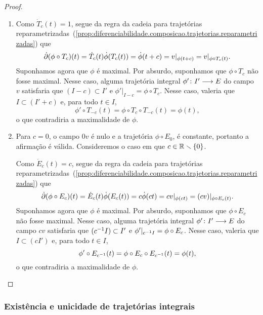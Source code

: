 \begin{proof}
	\begin{enumerate}
	\item Como $\dot T_{c}(t) = 1$, segue da regra da cadeia para trajetórias reparametrizadas~(\ref{prop:diferenciabilidade.composicao.trajetorias.reparametrizadas}) que
		\begin{equation*}
		\dot{\partial}(\phi \circ T_{c})(t) = \dot T_{c}(t) \dot \phi(T_{c}(t)) = \dot \phi(t+c) = v|_{\phi(t+c)} = v|_{\phi \circ T_{c}(t)}.
		\end{equation*}
	Suponhamos agora que $\phi$ é maximal. Por absurdo, suponhamos que $\phi \circ T_{c}$ não fosse maximal. Nesse caso, alguma trajetória integral $\phi'\colon \allowbreak I' \longrightarrow E$ do campo $v$ satisfaria que $(I-c) \subset I'$ e $\phi'|_{I-c} = \phi \circ T_{c}$. Nesse caso, valeria que $I \subset (I'+c)$ e, para todo $t \in I$,
		\begin{equation*}
		\phi' \circ T_{-c}(t) = \phi \circ T_{c} \circ T_{-c} (t) = \phi(t),
		\end{equation*}
	o que contradiria a maximalidade de $\phi$.

	\item Para $c=0$, o campo $0v$ é nulo e a trajetória $\phi \circ E_{0}$, é constante, portanto a afirmação é válida. Consideremos o caso em que $c \in \mathbb{R} \smallsetminus \{0\}$.

	Como $\dot E_{c}(t) = c$, segue da regra da cadeia para trajetórias reparametrizadas~(\ref{prop:diferenciabilidade.composicao.trajetorias.reparametrizadas}) que
		\begin{equation*}
		\dot{\partial}(\phi \circ E_{c})(t) = \dot E_{c}(t) \dot \phi(E_{c}(t)) = c\dot \phi(ct) = cv|_{\phi(ct)} = (cv)|_{\phi \circ E_{c}(t)}.
		\end{equation*}
	Suponhamos agora que $\phi$ é maximal. Por absurdo, suponhamos que $\phi \circ E_{c}$ não fosse maximal. Nesse caso, alguma trajetória integral $\phi'\colon \allowbreak I' \longrightarrow E$ do campo $cv$ satisfaria que $(c^{-1} I) \subset I'$ e $\phi'|_{c^{-1} I} = \phi \circ E_{c}$. Nesse caso, valeria que $I \subset (cI')$ e, para todo $t \in I$,
		\begin{equation*}
		\phi' \circ E_{c^{-1}}(t) = \phi \circ E_{c} \circ E_{c^{-1}} (t) = \phi(t),
		\end{equation*}
	o que contradiria a maximalidade de $\phi$.
	\qedhere
	\end{enumerate}
\end{proof}

\subsubsection{Existência e unicidade de trajetórias integrais}

